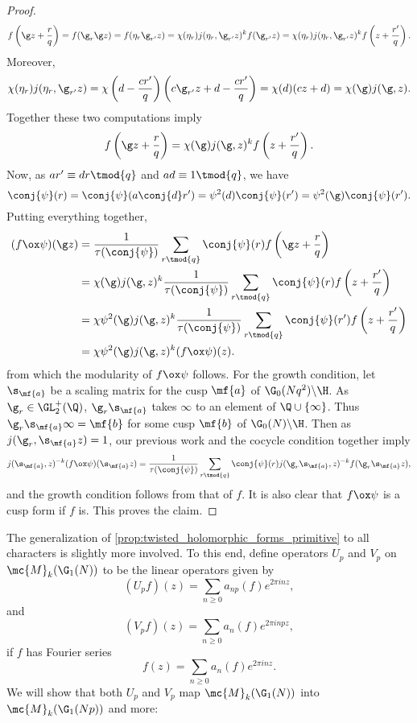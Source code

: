 \begin{proof}
      \[
        f\left(\g z+\frac{r}{q}\right) = f(\g_{r}\g z) = f(\eta_{r}\g_{r'}z) = \chi(\eta_{r})j(\eta_{r},\g_{r'}z)^{k}f(\g_{r'}z) = \chi(\eta_{r})j(\eta_{r},\g_{r'}z)^{k}f\left(z+\frac{r'}{q}\right).
      \]
      Moreover,
      \[
        \chi(\eta_{r})j(\eta_{r},\g_{r'}z) = \chi\left(d-\frac{cr'}{q}\right)\left(c\g_{r'}z+d-\frac{cr'}{q}\right) = \chi(d)(cz+d) = \chi(\g)j(\g,z).
      \]
      Together these two computations imply
      \[
        f\left(\g z+\frac{r}{q}\right) = \chi(\g)j(\g,z)^{k}f\left(z+\frac{r'}{q}\right).
      \]
      Now, as $ar' \equiv dr \tmod{q}$ and $ad \equiv 1 \tmod{q}$, we have
      \[
        \conj{\psi}(r) = \conj{\psi}(a\conj{d}r') = \psi^{2}(d)\conj{\psi}(r') = \psi^{2}(\g)\conj{\psi}(r').
      \]
      Putting everything together,
      \begin{align*}
        (f \ox \psi)(\g z) &= \frac{1}{\tau(\conj{\psi})}\sum_{r \tmod{q}}\conj{\psi}(r)f\left(\g z+\frac{r}{q}\right) \\
        &= \chi(\g)j(\g,z)^{k}\frac{1}{\tau(\conj{\psi})}\sum_{r \tmod{q}}\conj{\psi}(r)f\left(z+\frac{r'}{q}\right) \\
        &= \chi\psi^{2}(\g)j(\g,z)^{k}\frac{1}{\tau(\conj{\psi})}\sum_{r \tmod{q}}\conj{\psi}(r')f\left(z+\frac{r'}{q}\right) \\
        &= \chi\psi^{2}(\g)j(\g,z)^{k}(f \ox \psi)(z).
      \end{align*}
      from which the modularity of $f \ox \psi$ follows. For the growth condition, let $\s_{\mf{a}}$ be a scaling matrix for the cusp $\mf{a}$ of $\G_{0}(Nq^{2})\backslash\H$. As $\g_{r} \in \GL_{2}^{+}(\Q)$, $\g_{r}\s_{\mf{a}}$ takes $\infty$ to an element of $\Q \cup \{\infty\}$. Thus $\g_{r}\s_{\mf{a}}\infty = \mf{b}$ for some cusp $\mf{b}$ of $\G_{0}(N)\backslash\H$. Then as $j(\g_{r},\s_{\mf{a}}z) = 1$, our previous work and the cocycle condition together imply
      \[
        j(\s_{\mf{a}},z)^{-k}(f \ox \psi)(\s_{\mf{a}}z) = \frac{1}{\tau(\conj{\psi})}\sum_{r \tmod{q}}\conj{\psi}(r)j(\g_{r}\s_{\mf{a}},z)^{-k}f(\g_{r}\s_{\mf{a}}z),
      \]
      and the growth condition follows from that of $f$. It is also clear that $f \ox \psi$ is a cusp form if $f$ is. This proves the claim.
    \end{proof}

    The generalization of \cref{prop:twisted_holomorphic_forms_primitive} to all characters is slightly more involved. To this end, define operators $U_{p}$ and $V_{p}$ on $\mc{M}_{k}(\G_{1}(N))$ to be the linear operators given by
    \[
      (U_{p}f)(z) = \sum_{n \ge 0}a_{np}(f)e^{2\pi inz},
    \]
    and
    \[
      (V_{p}f)(z) = \sum_{n \ge 0}a_{n}(f)e^{2\pi inpz},
    \]
    if $f$ has Fourier series
    \[
      f(z) = \sum_{n \ge 0}a_{n}(f)e^{2\pi inz}.
    \]
    We will show that both $U_{p}$ and $V_{p}$ map $\mc{M}_{k}(\G_{1}(N))$ into $\mc{M}_{k}(\G_{1}(Np))$ and more:

